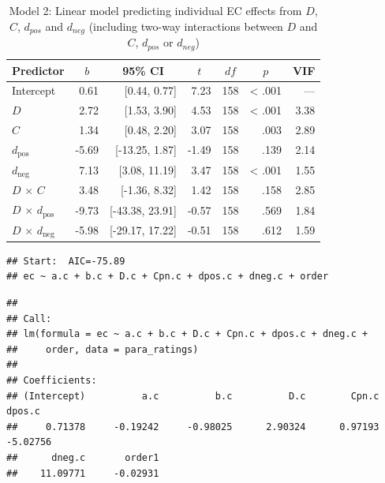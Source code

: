 \documentclass[
  man,floatsintext]{apa6}
\begin{document}
\begin{table}[tbp]

\begin{center}
\begin{threeparttable}

\caption{\label{tab:unnamed-chunk-31}Model 2: Linear model predicting individual EC effects from $D$, $C$, $d_{pos}$ and $d_{neg}$ (including two-way interactions between $D$ and $C$, $d_{pos}$ or $d_{neg}$)}

\begin{tabular}{lrrrrrr}
\toprule
Predictor & \multicolumn{1}{c}{$b$} & \multicolumn{1}{c}{95\% CI} & \multicolumn{1}{c}{$t$} & \multicolumn{1}{c}{$\mathit{df}$} & \multicolumn{1}{c}{$p$} & \multicolumn{1}{c}{VIF}\\
\midrule
Intercept & 0.61 & {}[0.44, 0.77] & 7.23 & 158 & < .001 & ---\\
$D$ & 2.72 & {}[1.53, 3.90] & 4.53 & 158 & < .001 & 3.38\\
$C$ & 1.34 & {}[0.48, 2.20] & 3.07 & 158 & .003 & 2.89\\
$d_{\mathrm{pos}}$ & -5.69 & {}[-13.25, 1.87] & -1.49 & 158 & .139 & 2.14\\
$d_{\mathrm{neg}}$ & 7.13 & {}[3.08, 11.19] & 3.47 & 158 & < .001 & 1.55\\
$D$ $\times$ $C$ & 3.48 & {}[-1.36, 8.32] & 1.42 & 158 & .158 & 2.85\\
$D$ $\times$ $d_{\mathrm{pos}}$ & -9.73 & {}[-43.38, 23.91] & -0.57 & 158 & .569 & 1.84\\
$D$ $\times$ $d_{\mathrm{neg}}$ & -5.98 & {}[-29.17, 17.22] & -0.51 & 158 & .612 & 1.59\\
\bottomrule
\end{tabular}

\end{threeparttable}
\end{center}

\end{table}

\begin{verbatim}
## Start:  AIC=-75.89
## ec ~ a.c + b.c + D.c + Cpn.c + dpos.c + dneg.c + order
\end{verbatim}

\begin{verbatim}
## 
## Call:
## lm(formula = ec ~ a.c + b.c + D.c + Cpn.c + dpos.c + dneg.c + 
##     order, data = para_ratings)
## 
## Coefficients:
## (Intercept)          a.c          b.c          D.c        Cpn.c       dpos.c  
##     0.71378     -0.19242     -0.98025      2.90324      0.97193     -5.02756  
##      dneg.c       order1  
##    11.09771     -0.02931
\end{verbatim}
\end{document}
